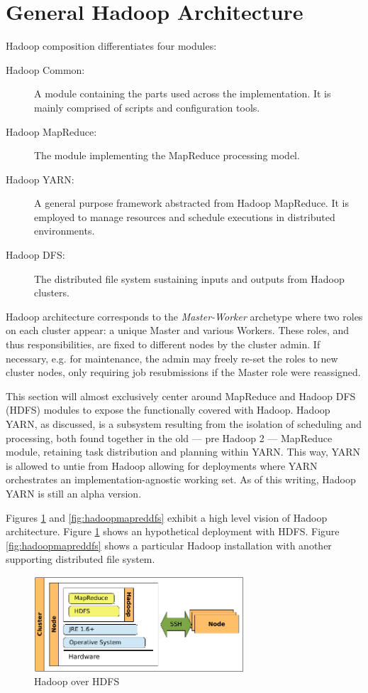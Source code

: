 \section{General Hadoop Architecture}\label{sec:arquitecturahadoop}
\noindent Hadoop composition differentiates four modules:
\begin{description}
 \item[Hadoop Common:] A module containing the parts used across the implementation. It is mainly comprised of scripts and configuration tools.
 \item[Hadoop MapReduce:] The module implementing the MapReduce processing model.
 \item[Hadoop YARN:] A general purpose framework abstracted from Hadoop MapReduce. It is employed to manage resources and schedule executions in distributed environments.
 \item[Hadoop DFS:] The distributed file system sustaining inputs and outputs from Hadoop clusters.
\end{description}

Hadoop architecture corresponds to the \emph{Master-Worker} archetype where two roles on each cluster appear: a unique Master and various Workers. These roles, and thus responsibilities, are fixed to different nodes by the cluster admin. If necessary, e.g. for maintenance, the admin may freely re-set the roles to new cluster nodes, only requiring job resubmissions if the Master role were reassigned.

This section will almost exclusively center around MapReduce and Hadoop DFS (HDFS) modules to expose the functionally covered with Hadoop. Hadoop YARN, as discussed, is a subsystem resulting from the isolation of scheduling and processing, both found together in the old --- pre Hadoop 2 --- MapReduce module, retaining task distribution and planning within YARN. This way, YARN is allowed to untie from Hadoop allowing for deployments where YARN orchestrates an implementation-agnostic working set. As of this writing, Hadoop YARN is still an alpha version.

Figures \ref{fig:hadoopmapredhdfs} and \ref{fig:hadoopmapreddfs} exhibit a high level vision of Hadoop architecture. Figure \ref{fig:hadoopmapredhdfs} shows an hypothetical deployment with HDFS. Figure \ref{fig:hadoopmapreddfs} shows a particular Hadoop installation with another supporting distributed file system.

\begin{figure}[tbp]
\begin{center}
\includegraphics[width=0.7\textwidth]{imagenes/015.pdf}
 \caption{Hadoop over HDFS}
\label{fig:hadoopmapredhdfs}
\end{center}
\end{figure}

